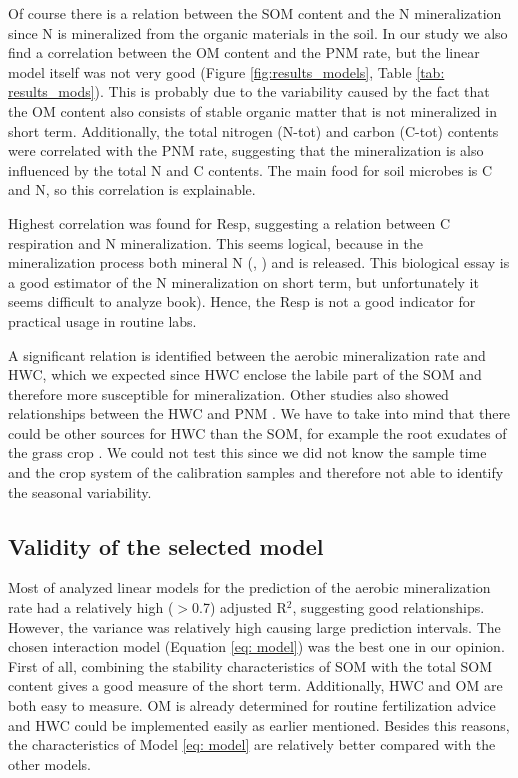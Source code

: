 \documentclass[10pt,twoside,dutch,english]{report}
\begin{document}
Of course there is a relation between the SOM content and the N mineralization since N is mineralized from the organic materials in the soil. In our study we also find a correlation between the OM content and the PNM rate, but the linear model itself was not very good (Figure \ref{fig:results_models}, Table \ref{tab: results_mods}). This is probably due to the variability caused by the fact that the OM content also consists of stable organic matter that is not mineralized in short term.  Additionally, the total nitrogen (N-tot) and carbon (C-tot) contents were correlated with the PNM rate, suggesting that the mineralization is also influenced by the total N and C contents. The main food for soil microbes is C and N, so this correlation is explainable.   

Highest correlation was found for Resp, suggesting a relation between C respiration and N mineralization. This seems logical, because in the mineralization process both mineral N (, ) and  is released.  This biological essay is a good estimator of the N mineralization on short term, but unfortunately it seems difficult to analyze \citep{Bloem2005} book). Hence, the Resp is not a good indicator for practical usage in routine labs.  

A significant relation is identified between the aerobic mineralization rate and HWC, which we expected since HWC enclose the labile part of the SOM \citep{Haynes2005, Hanegraaf2009} and therefore more susceptible for mineralization. Other studies also showed relationships between the HWC and PNM \citep{Ghani2003, Eekeren2010}. We have to take into mind that there could be other sources for HWC than the SOM, for example the root exudates of the grass crop \citep{Hanegraaf2009}. We could not test this since we did not know the sample time and the crop system of the calibration samples and therefore not able to identify the seasonal variability. 


   
\subsection{Validity of the selected model}
Most of analyzed linear models for the prediction of the aerobic mineralization rate had a relatively high ($>$0.7) adjusted R$^{2}$, suggesting good relationships. However, the variance was relatively high causing large prediction intervals.  
The chosen interaction model (Equation \ref{eq: model}) was the best one in our opinion. First of all, combining the stability characteristics of SOM with the total SOM content gives a good measure of the short term. Additionally,  HWC and OM are both  easy to measure.  OM is already determined for routine fertilization advice and HWC could be implemented easily as earlier mentioned.  Besides this reasons, the characteristics of Model \ref{eq: model} are relatively better compared with the other models. 
\end{document}
